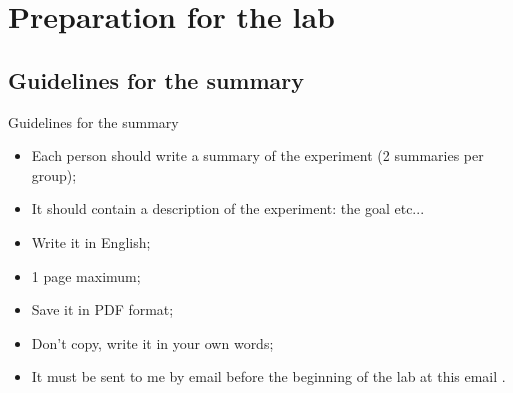 \documentclass[9pt, xcolor=dvipsnames]{beamer}
\newcommand{\hreff}[3][blue]{\href{#2}{\color{#1}{#3}}}%
\begin{document}

\section{Preparation for the lab}


\subsection{Guidelines for the summary }
\begin{frame}{Guidelines for the summary}


\begin{itemize}
	\item Each person should write a summary of the experiment (2 summaries per group);
	\item It should contain a description of the experiment:  the goal etc...
	\item Write it in English;
	\item 1 page maximum;
	\item Save it in PDF format;
	\item Don't copy, write it in your own words;
	\item It must be sent to me by email before the beginning of the lab at this email \hreff{mailto:masgalli@phys.ethz.ch}{masgalli@phys.ethz.ch}.
\end{itemize}


\end{frame}
\end{document}
